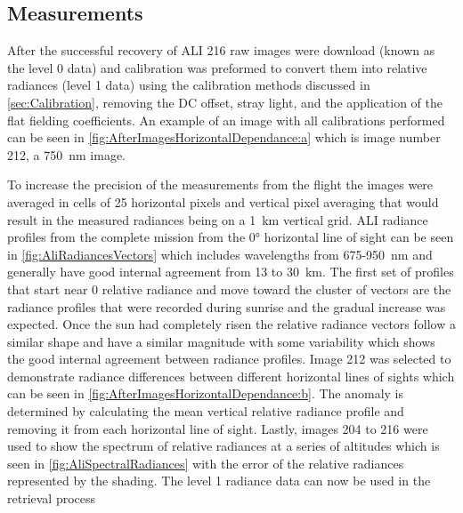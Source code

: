 \documentclass[12pt]{article}
\begin{document}

\subsection{Measurements}

After the successful recovery of ALI 216 raw images were download (known as the level 0 data) and calibration was preformed to convert them into relative radiances (level 1 data) using the calibration methods discussed in \autoref{sec:Calibration}, removing the DC offset, stray light, and the application of the flat fielding coefficients. An example of an image with all calibrations performed can be seen in \autoref{fig:AfterImagesHorizontalDependance:a} which is image number 212, a 750~nm image.

To increase the precision of the measurements from the flight the images were averaged in cells of 25 horizontal pixels and vertical pixel averaging that would result in the measured radiances being on a 1~km vertical grid.  ALI radiance profiles from the complete mission from the 0\si{\degree} horizontal line of sight can be seen in \autoref{fig:AliRadiancesVectors} which includes wavelengths from 675-950~nm and generally have good internal agreement from 13 to 30~km. The first set of profiles that start near 0 relative radiance and move toward the cluster of vectors are the radiance profiles that were recorded during sunrise and the gradual increase was expected. Once the sun had completely risen the relative radiance vectors follow a similar shape and have a similar magnitude with some variability which shows the good internal agreement between radiance profiles. Image 212 was selected to demonstrate radiance differences between different horizontal lines of sights which can be seen in \autoref{fig:AfterImagesHorizontalDependance:b}. The anomaly is determined by calculating the mean vertical relative radiance profile and removing it from each horizontal line of sight. Lastly, images 204 to 216 were used to show the spectrum of relative radiances at a series of altitudes which is seen in \autoref{fig:AliSpectralRadiances} with the error of the relative radiances represented by the shading. The level 1 radiance data can now be used in the retrieval process
\end{document}
